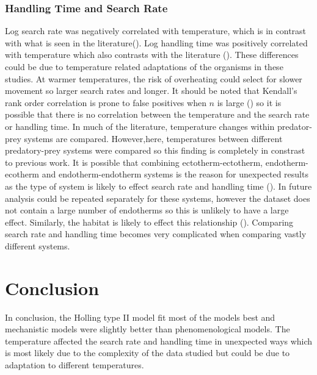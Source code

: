 \documentclass{article}
\begin{document}
\subsubsection{Handling Time and Search Rate}
Log search rate was negatively correlated with temperature, which is in contrast with what is seen in the literature(\cite{Thompson1978TowardsElegans,Zamani2006Temperature-dependentAphid,Sentis2012UsingEfficiency,Gilioli2005TemperatureIndividuals,Dell2014TemperatureStrategy,Englund2011TemperatureResponse}). Log handling time was positively correlated with temperature which also contrasts with the literature (\cite{Dell2014TemperatureStrategy,Thompson1978TowardsElegans,McCoull1998EffectNaucoridae,Jalali2010EffectPersicae,Zamani2006Temperature-dependentAphid,Sentis2012UsingEfficiency}).  
These differences could be due to temperature related adaptations of the organisms in these studies. At warmer temperatures, the risk of overheating could select for slower movement so larger search rates and longer. It should be noted that Kendall's rank order correlation is prone to false positives when $n$ is large (\cite{Dytham2011ChoosingEdition}) so it is possible that there is no correlation between the temperature and the search rate or handling time.
In much of the literature, temperature changes within predator-prey systems are compared. However,here, temperatures between different predatory-prey systems were compared so this finding is completely in constrast to previous work. 
It is possible that combining ectotherm-ectotherm, endotherm-ecotherm and endotherm-endotherm systems is the reason for unexpected results as the type of system is likely to effect search rate and handling time (\cite{Dell2014TemperatureStrategy}). In future analysis could be repeated separately for these systems, however the dataset does not contain a large number of endotherms so this is unlikely to have a large effect. Similarly, the habitat is likely to effect this relationship (\cite{Dell2014TemperatureStrategy}). Comparing search rate and handling time becomes very complicated when comparing vastly different systems. 
 \\
 \section{Conclusion}
In conclusion, the Holling type II model fit most of the models best and mechanistic models were slightly better than phenomenological models. The temperature affected the search rate and handling time in unexpected ways which is most likely due to the complexity of the data studied but could be due to adaptation to different temperatures.

\clearpage{}

\printbibliography
\end{document}
